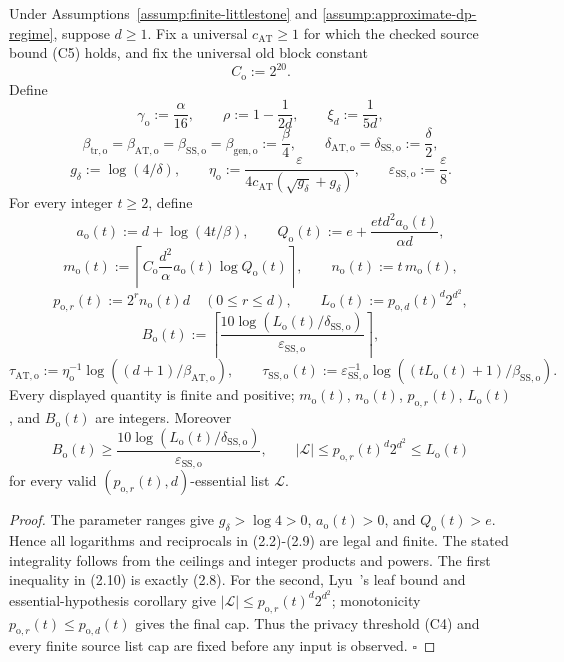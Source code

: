 \begin{lemma}\label{lem:step-015-dictionary}
Under Assumptions~\ref{assump:finite-littlestone} and
\ref{assump:approximate-dp-regime}, suppose \(d\ge1\). Fix a universal
\(c_{\mathrm{AT}}\ge1\) for which the checked source bound (C5) holds, and
fix the universal old block constant
\[
C_{\mathrm o}:=2^{20}.
\tag{2.1}
\]
Define
\[
\gamma_{\mathrm o}:=\frac{\alpha}{16},\qquad
\rho:=1-\frac1{2d},\qquad \xi_d:=\frac1{5d},
\tag{2.2}
\]
\[
\beta_{\mathrm{tr,o}}=\beta_{\mathrm{AT,o}}
=\beta_{\mathrm{SS,o}}=\beta_{\mathrm{gen,o}}:=\frac\beta4,
\qquad
\delta_{\mathrm{AT,o}}=\delta_{\mathrm{SS,o}}:=\frac\delta2,
\tag{2.3}
\]
\[
g_\delta:=\log(4/\delta),\qquad
\eta_{\mathrm o}:=
\frac{\varepsilon}
{4c_{\mathrm{AT}}(\sqrt{g_\delta}+g_\delta)},\qquad
\varepsilon_{\mathrm{SS,o}}:=\frac\varepsilon8.
\tag{2.4}
\]
For every integer \(t\ge2\), define
\[
a_{\mathrm o}(t):=d+\log(4t/\beta),\qquad
Q_{\mathrm o}(t):=
e+\frac{etd^2a_{\mathrm o}(t)}{\alpha d},
\tag{2.5}
\]
\[
m_{\mathrm o}(t):=
\left\lceil C_{\mathrm o}\frac{d^2}{\alpha}
a_{\mathrm o}(t)\log Q_{\mathrm o}(t)\right\rceil,\qquad
n_{\mathrm o}(t):=t\,m_{\mathrm o}(t),
\tag{2.6}
\]
\[
p_{\mathrm o,r}(t):=2^rn_{\mathrm o}(t)d
\quad(0\le r\le d),\qquad
L_{\mathrm o}(t):=p_{\mathrm o,d}(t)^d2^{d^2},
\tag{2.7}
\]
\[
B_{\mathrm o}(t):=
\left\lceil
\frac{10\log(L_{\mathrm o}(t)/\delta_{\mathrm{SS,o}})}
{\varepsilon_{\mathrm{SS,o}}}\right\rceil,
\tag{2.8}
\]
\[
\tau_{\mathrm{AT,o}}:=
\eta_{\mathrm o}^{-1}
\log((d+1)/\beta_{\mathrm{AT,o}}),\qquad
\tau_{\mathrm{SS,o}}(t):=
\varepsilon_{\mathrm{SS,o}}^{-1}
\log((tL_{\mathrm o}(t)+1)/\beta_{\mathrm{SS,o}}).
\tag{2.9}
\]
Every displayed quantity is finite and positive; \(m_{\mathrm o}(t)\),
\(n_{\mathrm o}(t)\), \(p_{\mathrm o,r}(t)\), \(L_{\mathrm o}(t)\), and
\(B_{\mathrm o}(t)\) are integers. Moreover
\[
B_{\mathrm o}(t)\ge
\frac{10\log(L_{\mathrm o}(t)/\delta_{\mathrm{SS,o}})}
{\varepsilon_{\mathrm{SS,o}}},
\qquad
|\mathcal L|\le p_{\mathrm o,r}(t)^d2^{d^2}
\le L_{\mathrm o}(t)
\tag{2.10}
\]
for every valid \((p_{\mathrm o,r}(t),d)\)-essential list
\(\mathcal L\).


\end{lemma}

\begin{proof}
The parameter ranges give \(g_\delta>\log4>0\),
\(a_{\mathrm o}(t)>0\), and \(Q_{\mathrm o}(t)>e\). Hence all logarithms
and reciprocals in (2.2)-(2.9) are legal and finite. The stated
integrality follows from the ceilings and integer products and powers.
The first inequality in (2.10) is exactly (2.8). For the second, Lyu~\citep{lyu2025}'s
leaf bound and essential-hypothesis corollary give
\(|\mathcal L|\le p_{\mathrm o,r}(t)^d2^{d^2}\); monotonicity
\(p_{\mathrm o,r}(t)\le p_{\mathrm o,d}(t)\) gives the final cap.
Thus the privacy threshold (C4) and every finite source list cap are fixed
before any input is observed. \(\square\)


\end{proof}

